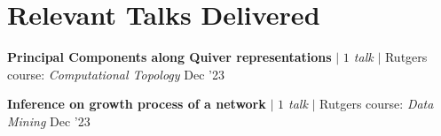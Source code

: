 
%




\vspace{-10pt}
\resumeSubHeadingListEnd



\vspace{-20pt}
\section{Relevant Talks Delivered}
\resumeSubHeadingListStart

\resumeProjectHeading
{\textbf{Principal Components along Quiver representations} $|$ \emph{$1$ talk} $|$ Rutgers course: \textit {Computational Topology}}
{Dec '23}
{}
\vspace{\mygap}

\resumeProjectHeading
{\textbf{Inference on growth process of a network} $|$ \emph{$1$ talk} $|$ Rutgers course: \textit{Data Mining}}
{Dec '23}
{}
\vspace{\mygap}


